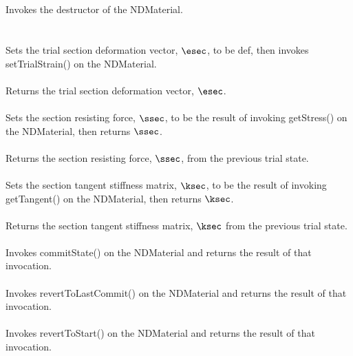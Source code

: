  \\
\\ 
Invokes the destructor of the NDMaterial. \\

 \\
  \\
Sets the trial section deformation vector, $\esec$, to be \p def, then invokes
setTrialStrain() on the NDMaterial. \\

 \\
Returns the trial section deformation vector, $\esec$. \\

 \\
Sets the section resisting force, $\ssec$, to be the result of invoking 
getStress() on the NDMaterial, then returns $\ssec$. \\

 \\
Returns the section resisting force, $\ssec$, from the previous trial state. \\

 \\
Sets the section tangent stiffness matrix, $\ksec$, to be the result of
invoking getTangent() on the NDMaterial, then returns $\ksec$. \\

 \\
Returns the section tangent stiffness matrix, $\ksec$ from the previous trial state. \\

 \\
Invokes commitState() on the NDMaterial and returns the
result of that invocation. \\

 \\
Invokes revertToLastCommit() on the NDMaterial and returns the
result of that invocation. \\

 \\
Invokes revertToStart() on the NDMaterial and returns the
result of that invocation. \\

